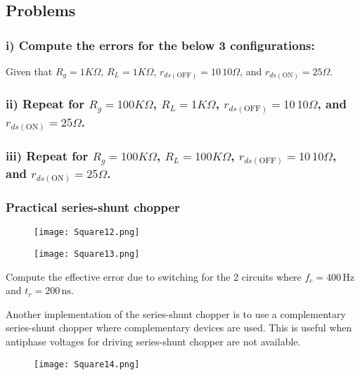 \documentclass[a4paper,9pt,twoside,openany,twocolumn]{memoir}
\begin{document}
\subsection*{Problems}

\subsubsection*{i) Compute the errors for the below 3 configurations:}
Given that $R_g = 1K\Omega$, $R_L = 1K\Omega$, $r_{ds(\text{OFF})} = 10\,10\Omega$, and $r_{ds(\text{ON})} = 25\Omega$.

\subsubsection*{ii) Repeat for $R_g = 100K\Omega$, $R_L = 1K\Omega$, $r_{ds(\text{OFF})} = 10\,10\Omega$, and $r_{ds(\text{ON})} = 25\Omega$.}

\subsubsection*{iii) Repeat for $R_g = 100K\Omega$, $R_L = 100K\Omega$, $r_{ds(\text{OFF})} = 10\,10\Omega$, and $r_{ds(\text{ON})} = 25\Omega$.}

\subsubsection*{Practical series-shunt chopper}
\begin{figure}[h]
    \centering
    \texttt{[image: Square12.png]}
    \caption{}
\end{figure}
\begin{figure}[h]
    \centering
    \texttt{[image: Square13.png]}
    \caption{}
\end{figure}

Compute the effective error due to switching for the 2 circuits where $f_c = 400\,\text{Hz}$ and $t_r = 200\,\text{ns}$.

Another implementation of the series-shunt chopper is to use a complementary series-shunt chopper where complementary devices are used. This is useful when antiphase voltages for driving series-shunt chopper are not available.

\begin{figure}[h]
    \centering
    \texttt{[image: Square14.png]}
    \caption{}
\end{figure}
\end{document}
